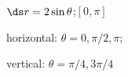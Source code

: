 {$\ds r=2\sin \theta$;\quad $[0,\pi]$}
{horizontal: $\theta=0,\pi/2,\pi$;

vertical: $\theta = \pi/4,3\pi/4$
}
